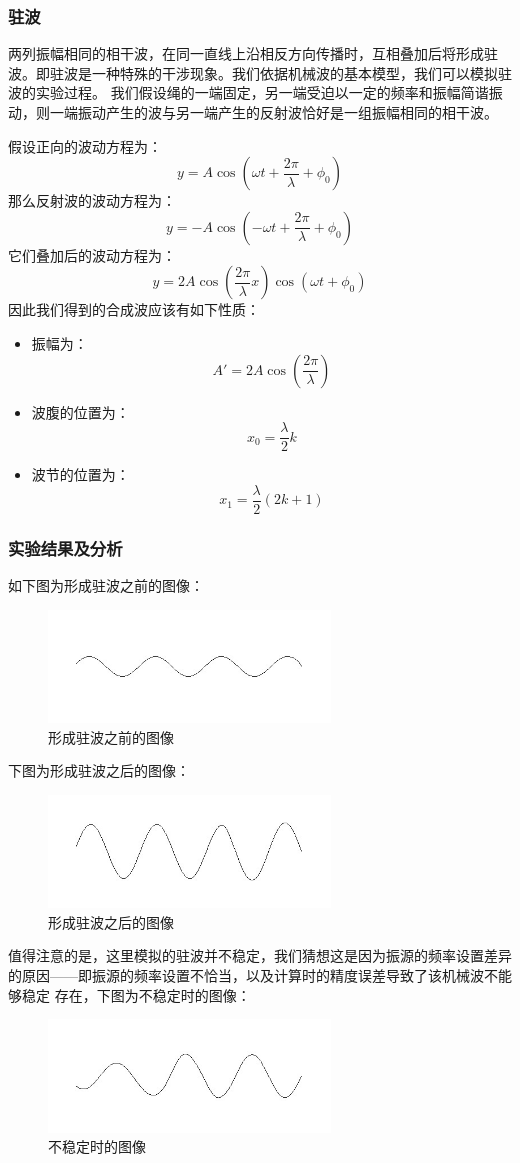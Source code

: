 ﻿\documentclass{article}
\begin{document}
	\subsubsection*{驻波}
	两列振幅相同的相干波，在同一直线上沿相反方向传播时，互相叠加后将形成驻波。即驻波是一种特殊的干涉现象。我们依据机械波的基本模型，我们可以模拟驻波的实验过程。
	我们假设绳的一端固定，另一端受迫以一定的频率和振幅简谐振动，则一端振动产生的波与另一端产生的反射波恰好是一组振幅相同的相干波。\par
	假设正向的波动方程为：
	\[y=A\cos\left(\omega t+\frac{2\pi}{\lambda}+\phi_0\right)\]
	那么反射波的波动方程为：
	\[y=-A\cos\left(-\omega t+\frac{2\pi}{\lambda}+\phi_0\right)\]
	它们叠加后的波动方程为：
	\[y=2A\cos\left(\frac{2\pi}{\lambda}x\right)\cos(\omega t+\phi_0)\]
	因此我们得到的合成波应该有如下性质：
	\begin{itemize}
		\item 振幅为：
		\[A'=2A\cos\left(\frac{2\pi}{\lambda}\right)\]
		\item 波腹的位置为：
		\[x_0=\frac{\lambda}{2}k\]
		\item 波节的位置为：
		\[x_1=\frac{\lambda}{2}(2k+1)\]
	\end{itemize}
	\subsubsection{实验结果及分析}
	如下图为形成驻波之前的图像：
	\begin{figure}[H]
		\centering
		\includegraphics[height=3cm]{1.jpg}
		\caption{形成驻波之前的图像}
	\end{figure}
	下图为形成驻波之后的图像：
	\begin{figure}[H]
		\centering
		\includegraphics[height=3cm]{2.jpg}
		\caption{形成驻波之后的图像}
	\end{figure}
	值得注意的是，这里模拟的驻波并不稳定，我们猜想这是因为振源的频率设置差异的原因——即振源的频率设置不恰当，以及计算时的精度误差导致了该机械波不能够稳定
	存在，下图为不稳定时的图像：
	\begin{figure}[H]
		\centering
		\includegraphics[height=3cm]{3.jpg}
		\caption{不稳定时的图像}
	\end{figure}
	\newpage
\end{document}
